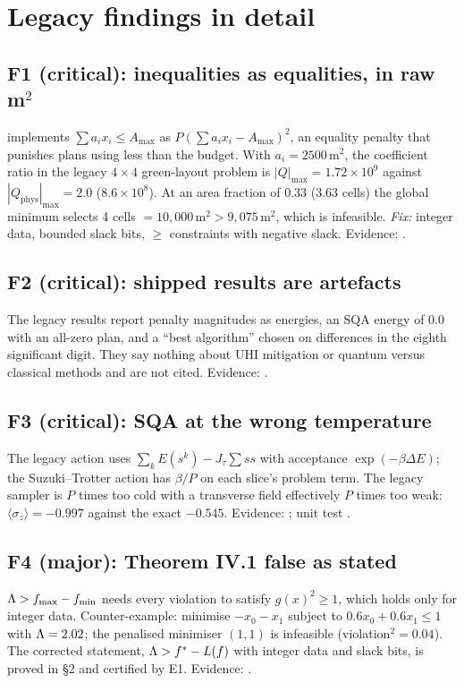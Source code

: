 \chapter{Legacy findings in detail}\label{app:legacy}
\section*{F1 (critical): inequalities as equalities, in raw m$^2$}
 implements $\sum a_ix_i\le A_{\max}$ as
$P(\sum a_ix_i-A_{\max})^2$, an equality penalty that punishes plans using less than the budget.
With $a_i=2500$\,m$^2$, the coefficient ratio in the legacy $4\times4$ green-layout problem is
$|Q|_{\max}=1.72\times10^{9}$ against $|Q_{\mathrm{phys}}|_{\max}=2.0$ ($8.6\times10^{8}$). At an area
fraction of 0.33 (3.63 cells) the global minimum selects 4 cells $=10{,}000$\,m$^2>9{,}075$\,m$^2$,
which is infeasible. \emph{Fix:} integer data, bounded slack bits, $\ge$ constraints with negative
slack. Evidence:  .

\section*{F2 (critical): shipped results are artefacts}
The legacy results report penalty magnitudes as \QUBO{} energies, an SQA energy of 0.0 with an
all-zero plan, and a ``best algorithm'' chosen on differences in the eighth significant digit. They
say nothing about UHI mitigation or quantum versus classical methods and are not cited. Evidence:
.

\section*{F3 (critical): SQA at the wrong temperature}
The legacy action uses $\sum_kE(s^k)-J_\tau\sum ss$ with acceptance $\exp(-\beta\Delta E)$; the
Suzuki--Trotter action has $\beta/P$ on each slice's problem term. The legacy sampler is $P$ times too
cold with a transverse field effectively $P$ times too weak: $\langle\sigma_z\rangle=-0.997$ against the
exact $-0.545$. Evidence: ; unit test .

\section*{F4 (major): Theorem IV.1 false as stated}
$\Lambda>f_{\max}-f_{\min}$ needs every violation to satisfy $g(x)^2\ge1$, which holds only for integer
data. Counter-example: minimise $-x_0-x_1$ subject to $0.6x_0+0.6x_1\le1$ with $\Lambda=2.02$; the
penalised minimiser $(1,1)$ is infeasible (violation$^2=0.04$). The corrected statement,
$\Lambda>f^\ast-L(f)$ with integer data and slack bits, is proved in  \S2 and
certified by E1. Evidence: .

